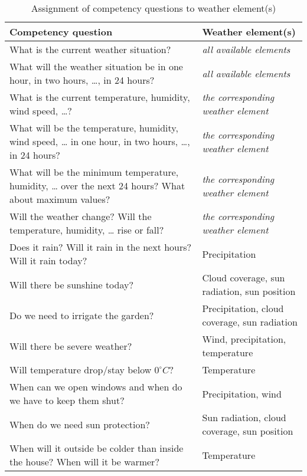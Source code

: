 \begin{table}
\begin{tabularx}{\textwidth}{|X|X|}
\hline
\textbf{Competency question} & \textbf{Weather element(s)} \\
\hline \hline
What is the current weather situation? & \emph{all available elements} \\
\hline
What will the weather situation be in one hour, in two hours, …, in 24 hours? & \emph{all available elements} \\
\hline
What is the current temperature, humidity, wind speed, …? & \emph{the corresponding weather element} \\
\hline
What will be the temperature, humidity, wind speed, … in one hour, in two hours, …, in 24 hours? & \emph{the corresponding weather element} \\
\hline
What will be the minimum temperature, humidity, … over the next 24 hours? What about maximum values? & \emph{the corresponding weather element} \\
\hline
Will the weather change? Will the temperature, humidity, … rise or fall? & \emph{the corresponding weather element} \\
\hline
Does it rain? Will it rain in the next hours? Will it rain today? & Precipitation \\
\hline
Will there be sunshine today? & Cloud coverage, sun radiation, sun position \\
\hline
Do we need to irrigate the garden? & Precipitation, cloud coverage, sun radiation \\
\hline
Will there be severe weather? & Wind, precipitation, temperature \\
\hline
Will temperature drop/stay below $0^\circ C$? & Temperature \\
\hline
When can we open windows and when do we have to keep them shut? & Precipitation, wind \\
\hline
When do we need sun protection? & Sun radiation, cloud coverage, sun position \\
\hline
When will it outside be colder than inside the house? When will it be warmer? & Temperature \\
\hline
\end{tabularx}
\label{table:competency_questions}
\caption{Assignment of competency questions to weather element(s)}
\end{table}


